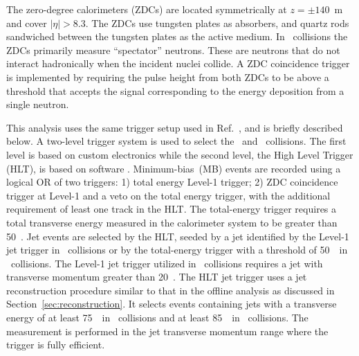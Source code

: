 
The zero-degree calorimeters (ZDCs) are located symmetrically at $z = \pm140$~m and cover $|\eta| > 8.3$.
The ZDCs use tungsten plates as absorbers, and quartz rods sandwiched between the tungsten plates as the active medium.
In \PbPb\ collisions the ZDCs primarily measure ``spectator'' neutrons.
These are neutrons that do not interact hadronically when the incident nuclei collide.
A ZDC coincidence trigger is implemented by requiring the pulse height from both ZDCs to be above a threshold that accepts the signal corresponding to the energy deposition from a single neutron.

This analysis uses the same trigger setup used in Ref.~\cite{Aaboud:2018hpb}, and is briefly described below.
A two-level trigger system is used to select the \PbPb\ and \pp\ collisions.
The first level is based on custom electronics while the second level, the High Level Trigger (HLT), is based on software \cite{Aaboud:2016leb}.
Minimum-bias~(MB) events are recorded using a logical OR of two triggers: 1) total energy Level-1 trigger; 2) ZDC coincidence trigger at Level-1 and a veto on the total energy trigger, with the additional requirement of least one track in the HLT.
The total-energy trigger requires a total transverse energy measured in the calorimeter system to be greater than 50~\GeV.
Jet events are selected by the HLT, seeded by a jet identified by the Level-1 jet trigger in \pp\ collisions or by the total-energy trigger with a threshold of 50~\GeV\ in \PbPb\ collisions.
The Level-1 jet trigger utilized in \pp\ collisions requires a jet with transverse momentum greater than 20~\GeV.
The HLT jet trigger uses a jet reconstruction procedure similar to that in the offline analysis as discussed in Section~\ref{sec:reconstruction}.
It selects events containing jets with a transverse energy of at least 75~\GeV\ in \PbPb\ collisions and at least 85~\GeV\ in \pp\ collisions.
The measurement is performed in the jet transverse momentum range where the trigger is fully efficient.





